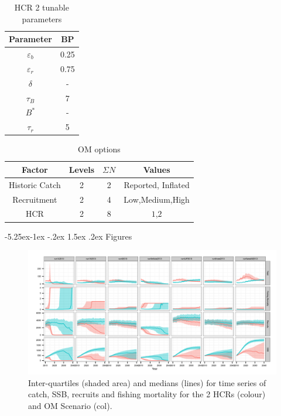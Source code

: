 \documentclass[a4paper, 10pt]{article}
\makeatletter
\newcommand{\veps}{\varepsilon}
\renewcommand{\section}{\@startsection{section}{1}{\z@}%
 {-5.25ex\@plus -1ex \@minus -.2ex}%
 {1.5ex \@plus .2ex}%
 {\normalfont\bfseries}}
\makeatother
\begin{document}
\begin{table}[ht]
\begin{center}
\begin{tabular}{|cc|}
\hline
Parameter & BP\\
\hline\hline
$\veps_b$ & 0.25\\
$\veps_r$ & 0.75\\
$\delta$ & - \\
$\tau_B$ & 7\\
$B^*$ & -\\
$\tau_r$ & 5\\
\hline
\end{tabular}
\end{center}
\caption{HCR 2 tunable parameters}
\label{tab2}
\end{table}

\begin{table}
\begin{center}
\label{tab:datasumm}
\begin{tabular}{|cccc|}
\hline
{\tiny Factor} & {\tiny Levels} & {\tiny $\Sigma N$} & {\tiny Values} \\
\hline\hline
{\tiny Historic Catch} 	        & {\tiny 2}   & {\tiny  2}  	& {\tiny  Reported, Inflated}          \\
{\tiny Recruitment} 		& {\tiny 2}   & {\tiny  4}  	& {\tiny  Low,Medium,High}  	       \\
{\tiny HCR} 	   	        & {\tiny 2}   & {\tiny  8} 	& {\tiny  $1$,$2$} 	       \\
\hline
\end{tabular}
\end{center}
\caption{OM options}
\label{tab:om}
\end{table}

\newpage\clearpage

\begin{landscape}
\section{Figures}
\begin{figure}[htbp]
\centering
\includegraphics[width=8in]{ts.png}
\caption{Inter-quartiles (shaded area) and medians (lines) for time series of catch, SSB, recruits and fishing mortality for the 2 HCRs (colour) and 
OM Scenario (col).}
\label{fig:1}
\end{figure}
\end{landscape}
\end{document}
